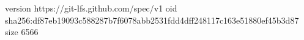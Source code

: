 version https://git-lfs.github.com/spec/v1
oid sha256:df87eb19093c588287b7f6078abb2531fdd4dff248117c163e51880ef45b3d87
size 6566

